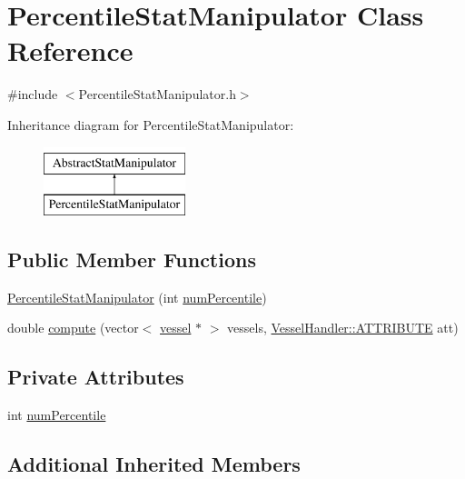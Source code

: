 \hypertarget{class_percentile_stat_manipulator}{}\section{Percentile\+Stat\+Manipulator Class Reference}
\label{class_percentile_stat_manipulator}


{\ttfamily \#include $<$Percentile\+Stat\+Manipulator.\+h$>$}

Inheritance diagram for Percentile\+Stat\+Manipulator\+:\begin{figure}[H]
\begin{center}
\leavevmode
\includegraphics[height=2.000000cm]{d1/df3/class_percentile_stat_manipulator}
\end{center}
\end{figure}
\subsection*{Public Member Functions}
\begin{DoxyCompactItemize}
\item 
\hyperlink{class_percentile_stat_manipulator_abbf6cd7ebe4b1ac28ed5dd7251bd0a98}{Percentile\+Stat\+Manipulator} (int \hyperlink{class_percentile_stat_manipulator_a6a035c7f4cc7612c37486f81ef329093}{num\+Percentile})
\item 
double \hyperlink{class_percentile_stat_manipulator_aba7f8a15c5f22b5ac043e4cd97a6f8b6}{compute} (vector$<$ \hyperlink{structvessel}{vessel} $\ast$ $>$ vessels, \hyperlink{class_vessel_handler_a6cc775e9a5bcbe69ef381f56b52982e7}{Vessel\+Handler\+::\+A\+T\+T\+R\+I\+B\+U\+TE} att)
\end{DoxyCompactItemize}
\subsection*{Private Attributes}
\begin{DoxyCompactItemize}
\item 
int \hyperlink{class_percentile_stat_manipulator_a6a035c7f4cc7612c37486f81ef329093}{num\+Percentile}
\end{DoxyCompactItemize}
\subsection*{Additional Inherited Members}


